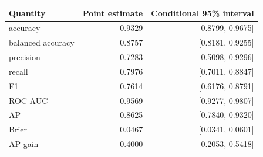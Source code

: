 \begin{tabular}{lrr}\toprule
Quantity & Point estimate & Conditional 95\% interval\\\midrule
accuracy & 0.9329 & [0.8799, 0.9675]\\
balanced accuracy & 0.8757 & [0.8181, 0.9255]\\
precision & 0.7283 & [0.5098, 0.9296]\\
recall & 0.7976 & [0.7011, 0.8847]\\
F1 & 0.7614 & [0.6176, 0.8791]\\
ROC AUC & 0.9569 & [0.9277, 0.9807]\\
AP & 0.8625 & [0.7840, 0.9320]\\
Brier & 0.0467 & [0.0341, 0.0601]\\
AP gain & 0.4000 & [0.2053, 0.5418]\\
\bottomrule\end{tabular}
